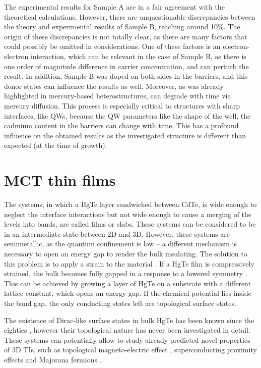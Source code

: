 \documentclass[titlepage,a4paper]{book}
\newcommand{\wciecie}{\quad\phantom{v}}
\begin{document}
The experimental results for Sample A are in a fair agreement with the theoretical calculations. However, there are unquestionable discrepancies between the theory and experimental results of Sample B, reaching around 10\%. The origin of these discrepancies is not totally clear, as there are many factors that could possibly be omitted in considerations. One of these factors is an electron-electron interaction, which can be relevant in the case of Sample B, as there is one order of magnitude difference in carrier concentration, and can perturb the result. In addition, Sample B was doped on both sides in the barriers, and this donor states can influence the results as well. Moreover, as was already highlighted in \cite{Zholudev_MCT_QW} mercury-based heterostructures, can degrade with time via mercury diffusion. This process is especially critical to structures with sharp interfaces, like QWs, because the QW parameters like the shape of the well, the cadmium content in the barriers can change with time. This has a profound influence on the obtained results as the investigated structure is different than expected (at the time of growth).  

\clearpage
\section{MCT thin films}
\label{chpt:MCT_TF}
\wciecie
The systems, in which a HgTe layer sandwiched between CdTe, is wide enough to neglect the interface interactions but not wide enough to cause a merging of the levels into bands, are called films or slabs. These systems can be considered to be in an intermediate state between 2D and 3D. However, these systems are semimetallic, as the quantum confinement is low -- a different mechanism is necessary to open an energy gap to render the bulk insulating. The solution to this problem is to apply a strain to the material \cite{Dai_MCT_layers}. If a HgTe film is compressively strained, the bulk becomes fully gapped in a response to a lowered symmetry \cite{Brune_State2}. This can be achieved by growing a layer of HgTe on a substrate with a different lattice constant, which opens an energy gap. If the chemical potential lies inside the band gap, the only conducting states left are topological surface states. 

The existence of Dirac-like surface states in bulk HgTe has been known since the eighties \cite{Dyakonov_MCT_layers}\cite{Chang_MCT_layers}, however their topological nature has never been investigated in detail. These systems can potentially allow to study already predicted novel properties of 3D TIs, such as topological magneto-electric effect \cite{Qi_MCT_layers}, superconducting proximity effects and Majorana fermions \cite{Oostinga_MCT_layers}\cite{Fu_MCT_layers}.
\end{document}
